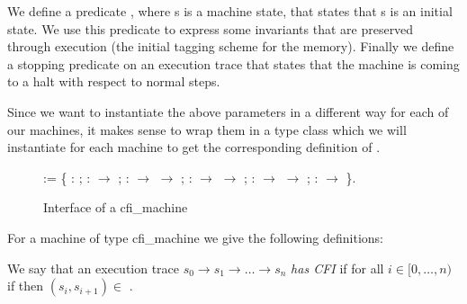We define a predicate , where s is a machine state, that
states that s is an initial state. We use this predicate to express some
invariants that are preserved through execution (\EG the initial tagging scheme
for the memory). Finally we define a stopping predicate on an execution trace
that states that the machine is coming to a halt with respect to normal steps.

Since we want to instantiate the above parameters in a different way for
each of our machines, it makes sense to wrap them in a type class which
we will instantiate for each machine to get the corresponding definition
of \CFI.

\begin{figure}[!htpb]
\begin{coqdoccode}
\coqdocnoindent
{}  := \{\coqdoceol
\coqdocindent{1.00em}
 : ;\coqdoceol
\coqdocindent{1.00em}
 :  \ensuremath{\rightarrow} ;\coqdoceol
\coqdocindent{1.00em}
\coqdoceol
\coqdocindent{1.00em}
 :  \ensuremath{\rightarrow}  \ensuremath{\rightarrow} ;\coqdoceol
\coqdocindent{1.00em}
 :  \ensuremath{\rightarrow}  \ensuremath{\rightarrow} ;\coqdoceol
\coqdocnoindent
\coqdoceol
\coqdocindent{1.00em}
 :  \ensuremath{\rightarrow}  \ensuremath{\rightarrow} ;\coqdoceol
\coqdocindent{1.00em}
 :   \ensuremath{\rightarrow} \coqdoceol
\coqdocnoindent
\}.\coqdoceol
\end{coqdoccode}
\caption{Interface of a cfi\_machine}
\label{fig:cfi_machine}
\end{figure}


For a machine of type cfi\_machine we give the following definitions:

\begin{definition}\label{definition:traceHasCfi}
  We say that an execution trace $s_0 \to s_1 \to \ldots \to s_n$ {\em has CFI}
  if for all $ i \in [0,\ldots,n)$ if  then
  $(s_i,s_{i+1}) \in$ \SUCC .
\end{definition}


